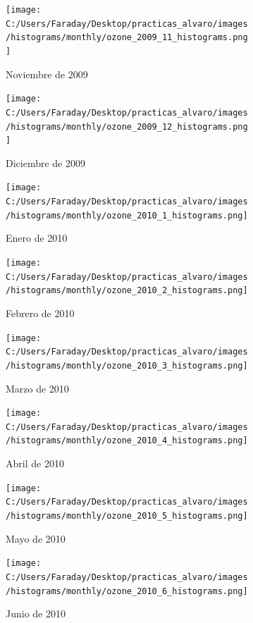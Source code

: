 \documentclass[12pt]{article}
\begin{document}
\begin{figure}[H]
\centering
\begin{subfigure}[h]{0.45\textwidth}
\texttt{[image: C:/Users/Faraday/Desktop/practicas\_alvaro/images/histograms/monthly/ozone\_2009\_11\_histograms.png]}
\caption{Noviembre de 2009}
\label{fig:hist-mon-2-11-2009}
\end{subfigure}
%
\begin{subfigure}[H]{0.45\textwidth}
\texttt{[image: C:/Users/Faraday/Desktop/practicas\_alvaro/images/histograms/monthly/ozone\_2009\_12\_histograms.png]}
\caption{Diciembre de 2009}
\label{fig:hist-mon-2-12-2009}
\end{subfigure}
\caption{}
\end{figure}

\newpage

\begin{figure}[H]
\centering
\begin{subfigure}[h]{0.45\textwidth}
\texttt{[image: C:/Users/Faraday/Desktop/practicas\_alvaro/images/histograms/monthly/ozone\_2010\_1\_histograms.png]}
\caption{Enero de 2010}
\label{fig:hist-mon-2-1-2010}
\end{subfigure}
%
\begin{subfigure}[H]{0.45\textwidth}
\texttt{[image: C:/Users/Faraday/Desktop/practicas\_alvaro/images/histograms/monthly/ozone\_2010\_2\_histograms.png]}
\caption{Febrero de 2010}
\label{fig:hist-mon-2-2-2010}
\end{subfigure}
\caption{}
\end{figure}

\begin{figure}[H]
\centering
\begin{subfigure}[h]{0.45\textwidth}
\texttt{[image: C:/Users/Faraday/Desktop/practicas\_alvaro/images/histograms/monthly/ozone\_2010\_3\_histograms.png]}
\caption{Marzo de 2010}
\label{fig:hist-mon-2-3-2010}
\end{subfigure}
%
\begin{subfigure}[H]{0.45\textwidth}
\texttt{[image: C:/Users/Faraday/Desktop/practicas\_alvaro/images/histograms/monthly/ozone\_2010\_4\_histograms.png]}
\caption{Abril de 2010}
\label{fig:hist-mon-2-4-2010}
\end{subfigure}
\caption{}
\end{figure}

\begin{figure}[H]
\centering
\begin{subfigure}[h]{0.45\textwidth}
\texttt{[image: C:/Users/Faraday/Desktop/practicas\_alvaro/images/histograms/monthly/ozone\_2010\_5\_histograms.png]}
\caption{Mayo de 2010}
\label{fig:hist-mon-2-5-2010}
\end{subfigure}
%
\begin{subfigure}[H]{0.45\textwidth}
\texttt{[image: C:/Users/Faraday/Desktop/practicas\_alvaro/images/histograms/monthly/ozone\_2010\_6\_histograms.png]}
\caption{Junio de 2010}
\label{fig:hist-mon-2-6-2010}
\end{subfigure}
\caption{}
\end{figure}
\end{document}
